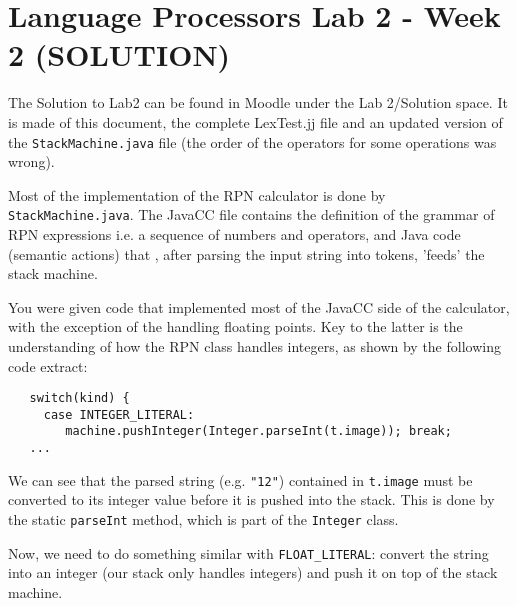 \documentclass{article}
\begin{document}
\thispagestyle{empty}

\newcommand{\negra}[1]{\textbf{#1}}

\section*{Language Processors Lab 2 - Week 2 (SOLUTION)}

The Solution to Lab2 can be found in Moodle under the Lab 2/Solution space. It is made of this document, the complete LexTest.jj file and an updated version of the \verb+StackMachine.java+ file (the order of the operators for some operations was wrong).

Most of the implementation of the RPN calculator is done by \verb+StackMachine.java+. The JavaCC file contains the definition of the grammar of RPN expressions i.e. a sequence of numbers and operators, and Java code (semantic actions) that , after parsing the input string into tokens, 'feeds' the stack machine.

You were given code that implemented most of the JavaCC side of the calculator, with the exception of the handling floating points. Key to the latter is the understanding of how the RPN class handles integers, as shown by the following code extract:
\begin{verbatim}
   switch(kind) {
     case INTEGER_LITERAL:
        machine.pushInteger(Integer.parseInt(t.image)); break;
   ...
\end{verbatim} 
We can see that the parsed string (e.g. \verb+"12"+) contained in \verb+t.image+ must be converted to its integer value before it is pushed into the stack. This is done by the static \verb+parseInt+ method, which is part of the \verb+Integer+ class.

Now, we need to do something similar with \verb+FLOAT_LITERAL+: convert the string into an integer (our stack only handles integers) and push it on top of the stack machine.
\end{document}
